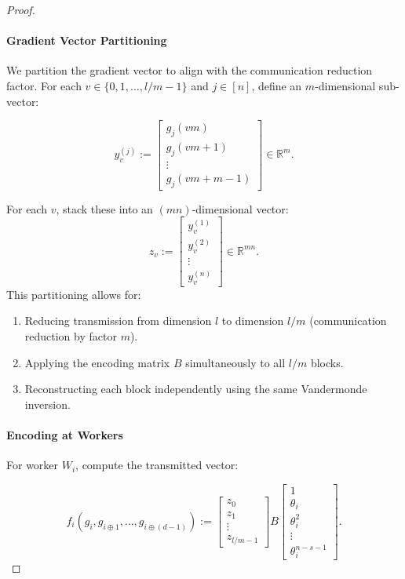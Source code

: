 \documentclass{report}
\theoremstyle{definition}
\begin{document}
\begin{proof}
    \paragraph{Gradient Vector Partitioning}
    We partition the gradient vector to align with the communication reduction factor. For each $v \in \{0, 1, \ldots, l/m - 1\}$ and $j \in [n]$, define an $m$-dimensional sub-vector:

    \begin{equation}
    y_v^{(j)} := \begin{bmatrix} g_j(vm) \\ g_j(vm + 1) \\ \vdots \\ g_j(vm + m - 1) \end{bmatrix} \in \mathbb{R}^m.
    \end{equation}

    \noindent For each $v$, stack these into an $(mn)$-dimensional vector:
    \begin{equation}
    z_v := \begin{bmatrix} y_v^{(1)} \\ y_v^{(2)} \\ \vdots \\ y_v^{(n)} \end{bmatrix} \in \mathbb{R}^{mn}.
    \end{equation}
    This partitioning allows for:
    \begin{enumerate}
        \item Reducing transmission from dimension $l$ to dimension $l/m$ (communication reduction by factor $m$).
        \item Applying the encoding matrix $B$ simultaneously to all $l/m$ blocks.
        \item Reconstructing each block independently using the same Vandermonde inversion.
    \end{enumerate}

    \paragraph{Encoding at Workers}
    For worker $W_i$, compute the transmitted vector:

    \begin{equation}
    f_i(g_i, g_{i \oplus 1}, \ldots, g_{i \oplus (d-1)}) := 
    \begin{bmatrix} z_0 \\ z_1 \\ \vdots \\ z_{l/m-1} \end{bmatrix} B 
    \begin{bmatrix} 1 \\ \theta_i \\ \theta_i^2 \\ \vdots \\ \theta_i^{n-s-1} \end{bmatrix}.
    \end{equation}


\end{proof}
\end{document}
